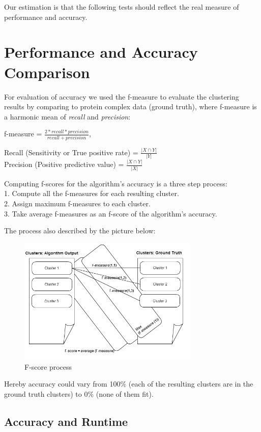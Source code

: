 \documentclass[journal]{IEEEtran}
\begin{document}
Our estimation is that the following tests should reflect the real measure of performance and accuracy.



\section{Performance and Accuracy Comparison}
For evaluation of accuracy we used the f-measure to evaluate the clustering results by comparing to protein complex data (ground truth), where f-measure is a harmonic mean of \textit{recall} and \textit{precision}:
\begin{center}
	f-measure = $\frac{2 * recall * precision}{recall + precision} $,\\	
\end{center} 
Recall (Sensitivity or True positive rate) = $\frac{|X \cap Y|}{|Y|}$\\
Precision (Positive predictive value) =  $\frac{|X \cap Y|}{|X|}$

Computing f-scores for the algorithm's accuracy is a three step process:\\
1. Compute all the f-measures for each resulting cluster.\\
2. Assign maximum f-measures to each cluster.\\
3. Take average f-measures as an f-score of the algorithm's accuracy. 

The process also described by the picture below:
\begin{figure}[h!]
\includegraphics[width=3.4in,clip,keepaspectratio]{f-measure}
\caption{F-score process}
\end{figure}


Hereby accuracy could vary from 100\% (each of the resulting clusters are in the ground truth clusters) to 0\% (none of them fit).

\subsection{Accuracy and Runtime}
\end{document}
